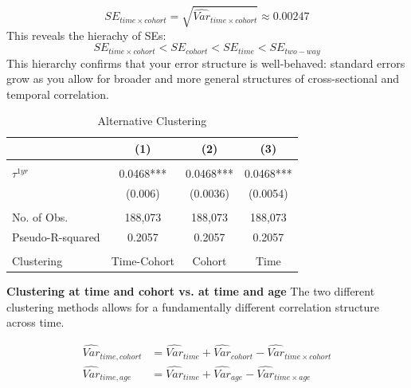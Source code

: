 \documentclass[10pt]{article}
\begin{document}
\begin{equation*}
SE_{time  \times cohort} = \sqrt { \widehat{Var}_{time  \times cohort}} \approx 0.00247
\end{equation*}
This reveals the hierachy of SEs:
\begin{equation*}
SE_{time  \times cohort} < SE_{cohort} < SE_{time} < SE_{two-way}
\end{equation*}
This hierarchy confirms that your error structure is well-behaved: standard errors grow as you allow for broader and more general structures of cross-sectional and temporal correlation.


\begin{table}[h!]
\begin{center}
\begin{threeparttable}
\caption{Alternative Clustering}
\label{table:alternative_clustering}

\begin{tabular}{lccc}
\hline\hline
 & (1)& (2)& (3)\\
 \hline \\[-1.8ex]


    $ \tau^{1yr} $&  0.0468***& 0.0468***& 0.0468***\\
                  &    (0.006)&  (0.0036)&  (0.0054)\\
                  &           &          &          \\
       No. of Obs.&    188,073&   188,073&   188,073\\
  Pseudo-R-squared&     0.2057&    0.2057&    0.2057\\



\multicolumn{4}{c}{}\\

Clustering& Time-Cohort& Cohort& Time\\


\hline\hline
\end{tabular}

\end{threeparttable}
\end{center}
\end{table}




{\textbf {Clustering at time and cohort vs. at time and age}}
The two different clustering methods allows for a fundamentally different correlation structure across time.

\begin{align*}
 \widehat{Var}_{time,cohort} &=  \widehat{Var}_{time} +  \widehat{Var}_{cohort} -  \widehat{Var}_{time  \times cohort}\\
 \widehat{Var}_{time,age} &=  \widehat{Var}_{time} +  \widehat{Var}_{age} -  \widehat{Var}_{time  \times age}
\end{align*}
\end{document}
